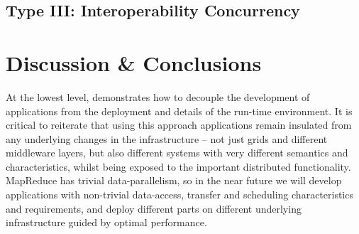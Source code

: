 \documentclass[3p,twocolumn]{elsarticle}
\begin{document}
\subsection{Type  III: Interoperability Concurrency}


\section{Discussion \& Conclusions}
\label{sec:discuss}







At the lowest level, \sagamapreduce demonstrates how to decouple the
development of applications from the deployment and details of the
run-time environment.  It is critical to reiterate that using this
approach applications remain insulated from any underlying changes in
the infrastructure -- not just grids and different middleware layers,
but also different systems with very different semantics and
characteristics, whilst being exposed to the important distributed
functionality.  MapReduce has trivial data-parallelism, so in the near
future we will develop applications with non-trivial data-access,
transfer and scheduling characteristics and requirements, and deploy
different parts on different underlying infrastructure guided by
optimal performance.
\end{document}
